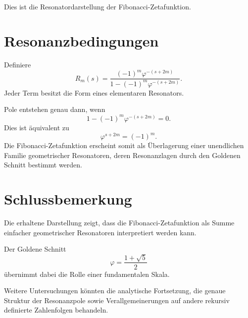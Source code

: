 \documentclass[11pt]{article}
\theoremstyle{definition}
\begin{document}
	Dies ist die Resonatordarstellung der Fibonacci-Zetafunktion.
	
	\section{Resonanzbedingungen}
	
	Definiere
	\[
	R_m(s)
	=
	\frac{
		(-1)^m\varphi^{-(s+2m)}
	}{
		1-(-1)^m\varphi^{-(s+2m)}
	}.
	\]
	Jeder Term besitzt die Form eines elementaren Resonators.
	
	Pole entstehen genau dann, wenn
	\[
	1-(-1)^m\varphi^{-(s+2m)}
	=0.
	\]
	Dies ist \"aquivalent zu
	\[
	\varphi^{s+2m}
	=
	(-1)^m.
	\]
	Die Fibonacci-Zetafunktion erscheint somit als \"Uberlagerung
	einer unendlichen Familie geometrischer Resonatoren,
	deren Resonanzlagen durch den Goldenen Schnitt bestimmt werden.
	
	\section{Schlussbemerkung}
	
	Die erhaltene Darstellung zeigt,
	dass die Fibonacci-Zetafunktion als Summe einfacher
	geometrischer Resonatoren interpretiert werden kann.
	
	Der Goldene Schnitt
	\[
	\varphi=\frac{1+\sqrt5}{2}
	\]
	\"ubernimmt dabei die Rolle einer fundamentalen Skala.
	
	Weitere Untersuchungen k\"onnten die analytische Fortsetzung,
	die genaue Struktur der Resonanzpole sowie Verallgemeinerungen
	auf andere rekursiv definierte Zahlenfolgen behandeln.
	
\end{document}
